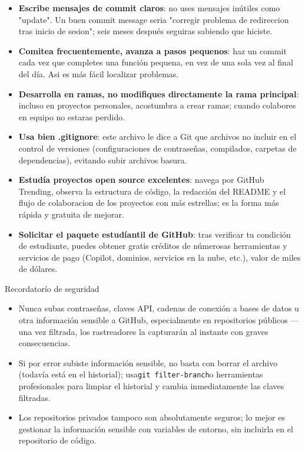 \begin{itemize}
  \item \textbf{Escribe mensajes de commit claros}: no uses mensajes inútiles como "update". Un buen commit message seria "corregir problema de redireccion tras inicio de sesion"; seis meses después seguiras sabiendo que hiciste.
  \item \textbf{Comitea frecuentemente, avanza a pasos pequenos}: haz un commit cada vez que completes una función pequena, en vez de una sola vez al final del día. Asi es más fácil localizar problemas.
  \item \textbf{Desarrolla en ramas, no modifiques directamente la rama principal}: incluso en proyectos personales, acostumbra a crear ramas; cuando colabores en equipo no estaras perdido.
  \item \textbf{Usa bien .gitignore}: este archivo le dice a Git que archivos no incluir en el control de versiones (configuraciones de contraseñas, compilados, carpetas de dependencias), evitando subir archivos basura.
  \item \textbf{Estudía proyectos open source excelentes}: navega por GitHub Trending, observa la estructura de código, la redacción del README y el flujo de colaboracion de los proyectos con más estrellas; es la forma más rápida y gratuita de mejorar.
  \item \textbf{Solicitar el paquete estudíantil de GitHub}: tras verificar tu condición de estudiante, puedes obtener gratis créditos de númerosas herramientas y servicios de pago (Copilot, dominios, servicios en la nube, etc.), valor de miles de dólares.
\end{itemize}

\begin{tcbwarn}{Recordatorío de seguridad}
\begin{itemize}
  \item Nunca subas contraseñas, claves API, cadenas de conexión a bases de datos u otra información sensible a GitHub, especialmente en repositorios públicos — una vez filtrada, los rastreadores la capturarán al instante con graves consecuencias.
  \item Si por error subiste información sensible, no basta con borrar el archivo (todavía está en el historial); usa\texttt{git filter-\allowbreak branch}o herramientas profesionales para limpiar el historial y cambia inmediatamente las claves filtradas.
  \item Los repositorios privados tampoco son absolutamente seguros; lo mejor es gestionar la información sensible con variables de entorno, sin incluirla en el repositorio de código.
\end{itemize}

\end{tcbwarn}

